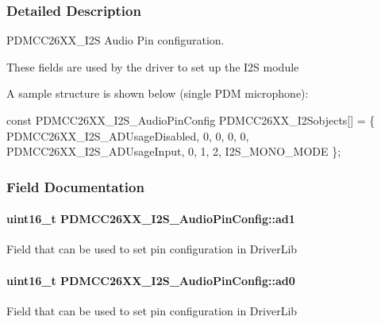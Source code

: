 \subsubsection{Detailed Description}
P\+D\+M\+C\+C26\+X\+X\+\_\+\+I2\+S Audio Pin configuration. 

These fields are used by the driver to set up the I2\+S module

A sample structure is shown below (single P\+D\+M microphone)\+: 
\begin{DoxyCode}
\textcolor{keyword}{const} PDMCC26XX_I2S_AudioPinConfig PDMCC26XX\_I2Sobjects[] = \{
        PDMCC26XX_I2S_ADUsageDisabled,
        0,
        0,
        0,
        0,
        PDMCC26XX_I2S_ADUsageInput,
        0,
        1,
        2,
        I2S\_MONO\_MODE
\};
\end{DoxyCode}
 

\subsubsection{Field Documentation}
\paragraph[{ad1}]{\setlength{\rightskip}{0pt plus 5cm}uint16\+\_\+t P\+D\+M\+C\+C26\+X\+X\+\_\+\+I2\+S\+\_\+\+Audio\+Pin\+Config\+::ad1}\label{union_p_d_m_c_c26_x_x___i2_s___audio_pin_config_afde140c72f0b7fff618278f466a42245}
Field that can be used to set pin configuration in Driver\+Lib 
\paragraph[{ad0}]{\setlength{\rightskip}{0pt plus 5cm}uint16\+\_\+t P\+D\+M\+C\+C26\+X\+X\+\_\+\+I2\+S\+\_\+\+Audio\+Pin\+Config\+::ad0}\label{union_p_d_m_c_c26_x_x___i2_s___audio_pin_config_a1ed6ea89aca197435fd2119774fc6992}
Field that can be used to set pin configuration in Driver\+Lib 
